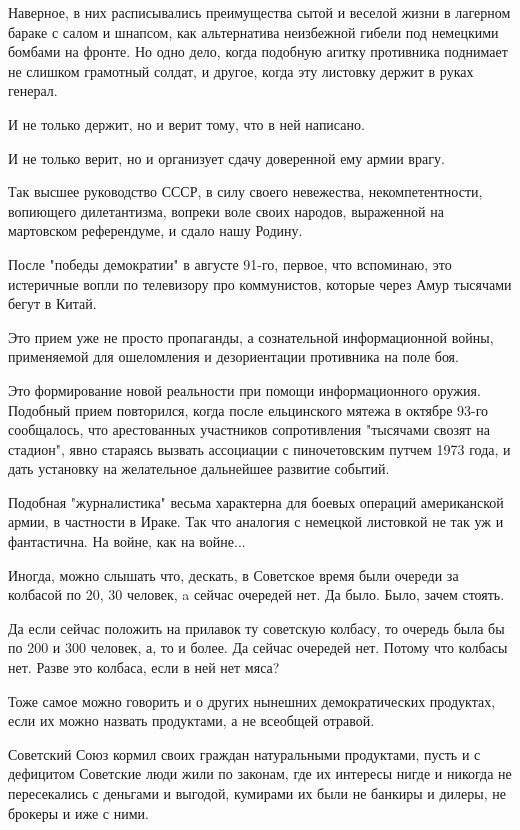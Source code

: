 Наверное, в них расписывались преимущества сытой и веселой жизни в лагерном
бараке с салом и шнапсом, как альтернатива неизбежной гибели под немецкими
бомбами на фронте. Но одно дело, когда подобную агитку противника поднимает не
слишком грамотный солдат, и другое, когда эту листовку держит в руках генерал.

И не только держит, но и верит тому, что в ней написано.

И не только верит, но и организует сдачу доверенной ему армии врагу.

Так высшее руководство СССР, в силу своего невежества, некомпетентности,
вопиющего дилетантизма, вопреки воле своих народов, выраженной на мартовском
референдуме, и сдало нашу Родину.

После "победы демократии" в августе 91-го, первое, что вспоминаю, это
истеричные вопли по телевизору про коммунистов, которые через Амур тысячами
бегут в Китай.

Это прием уже не просто пропаганды, а сознательной информационной войны,
применяемой для ошеломления и дезориентации противника на поле боя.

Это формирование новой реальности при помощи информационного оружия. Подобный
прием повторился, когда после ельцинского мятежа в октябре 93-го сообщалось,
что арестованных участников сопротивления "тысячами свозят на стадион", явно
стараясь вызвать ассоциации с пиночетовским путчем 1973 года, и дать установку
на желательное дальнейшее развитие событий.

Подобная "журналистика" весьма характерна для боевых операций американской
армии, в частности в Ираке. Так что аналогия с немецкой листовкой не так уж и
фантастична. На войне, как на войне...

Иногда, можно слышать что, дескать, в Советское время были очереди за колбасой
по 20, 30 человек, a сейчас очередей нет. Да было. Было, зачем стоять.

Да если сейчас положить на прилавок ту советскую колбасу, то очередь была бы по
200 и 300 человек, а, то и более. Да сейчас очередей нет. Потому что колбасы
нет. Разве это колбаса, если в ней нет мяса?

Тоже самое можно говорить и о других нынешних демократических продуктах, если
их можно назвать продуктами, а не всеобщей отравой.

Советский Союз кормил своих граждан натуральными продуктами, пусть и с
дефицитом Советские люди жили по законам, где их интересы нигде и никогда не
пересекались с деньгами и выгодой, кумирами их были не банкиры и дилеры, не
брокеры и иже с ними.


